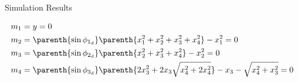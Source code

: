 \documentclass[final, usenames, dvipsnames]{beamer}
\newlength{\twocolwidth}
\begin{document}
\begin{frame}[t]
\begin{columns}[T,onlytextwidth]
\begin{column}{\twocolwidth}
\begin{block}{Simulation Results}
\begin{minipage}[t]{0.5\columnwidth}
\begin{itemize}
    \end{itemize}
        \begin{align*}\label{eq:terminal_constraints}
            \begin{split}
                m_1 &= y = 0  \\
                m_2 &= \parenth{\sin \phi_{1_{d}}} \parenth{ x_1^2 + x_2^2 + x_3^2 + x_4^2} - x_1^2 = 0 \\
                m_3 &= \parenth{\sin \phi_{2_{d}}} \parenth{ x_2^2 + x_3^2 + x_4^2} - x_2^2 = 0\\
                m_4 &= \parenth{\sin \phi_{3_{d}}} \parenth{ 2 x_3^2 + 2 x_3 \sqrt{x_4^2 + 2 x_4^2}} - x_3 - \sqrt{x_4^2 + x_3^2} = 0 
            \end{split}
        \end{align*}
    \end{minipage}


\end{block}
\end{column}
\end{columns}
\end{frame}
\end{document}
